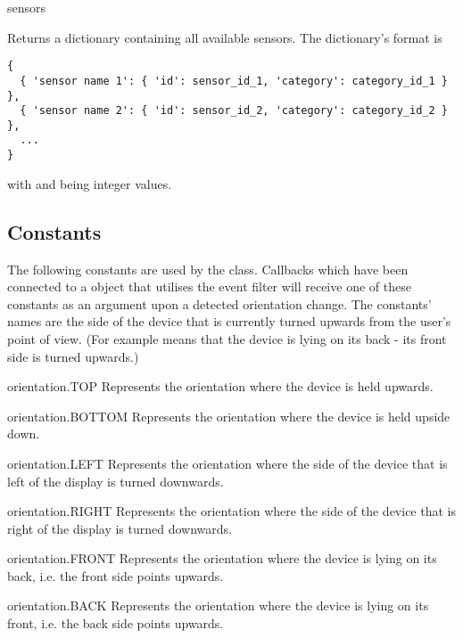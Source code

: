 \begin{funcdesc}{sensors}{}

Returns a dictionary containing all available sensors. The dictionary's format is
\begin{verbatim}
{
  { 'sensor name 1': { 'id': sensor_id_1, 'category': category_id_1 } },
  { 'sensor name 2': { 'id': sensor_id_2, 'category': category_id_2 } },
  ...
}
\end{verbatim}

with  and  being integer values.

\end{funcdesc}


\subsection{Constants}
\label{subsec:sensorconstants}
The following  constants are used by the  class.
Callbacks which have been connected to a  object that utilises the
 event filter will receive one of these constants as an argument
upon a detected orientation change. The constants' names are the side of the device that
is currently turned upwards from the user's point of view. (For example  means that
the device is lying on its back - its front side is turned upwards.)

\begin{memberdesc}{orientation.TOP}
Represents the orientation where the device is held upwards.
\end{memberdesc}
\begin{memberdesc}{orientation.BOTTOM}
Represents the orientation where the device is held upside down.
\end{memberdesc}
\begin{memberdesc}{orientation.LEFT}
Represents the orientation where the side of the device that is left of the display is turned downwards.
\end{memberdesc}
\begin{memberdesc}{orientation.RIGHT}
Represents the orientation where the side of the device that is right of the display is turned downwards.
\end{memberdesc}
\begin{memberdesc}{orientation.FRONT}
Represents the orientation where the device is lying on its back, i.e. the front side points upwards.
\end{memberdesc}
\begin{memberdesc}{orientation.BACK}
Represents the orientation where the device is lying on its front, i.e. the back side points upwards.
\end{memberdesc}


